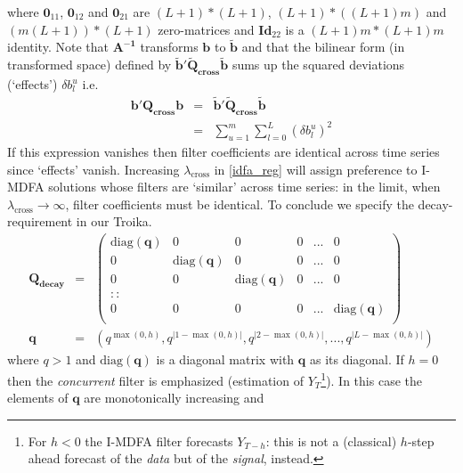 \documentclass[11pt]{article}
\begin{document}
where $\mathbf{0}_{11}$, $\mathbf{0}_{12}$ and $\mathbf{0}_{21}$ are $(L+1)*(L+1)$, $(L+1)*((L+1)m)$ and $(m(L+1))*(L+1)$ zero-matrices and $\mathbf{Id}_{22}$ is a $(L+1)m*(L+1)m$ identity. Note that $\mathbf{A^{-1}}$ transforms $\mathbf{b}$ to $\mathbf{\tilde{b}}$ and that the bilinear form (in transformed space)  defined by $\mathbf{\tilde{b}}'\mathbf{\tilde{Q}_{cross}}\mathbf{\tilde{b}}$  sums up the squared deviations (`effects') $\delta b_l^u$ i.e.
\begin{eqnarray*}
\mathbf{b'Q_{cross}b}&=&\mathbf{\tilde{b}}'\mathbf{\tilde{Q}_{cross}}\mathbf{\tilde{b}}\\
&=&\sum_{u=1}^m \sum_{l=0}^L(\delta b_l^u)^2
\end{eqnarray*}
If this expression vanishes then filter coefficients are identical across time series since  `effects' vanish. Increasing $\lambda_{\textrm{cross}}$ in \ref{idfa_reg} will assign preference to I-MDFA solutions whose filters are `similar' across time series: in the limit, when $\lambda_{\textrm{cross}}\to \infty$, filter coefficients must be identical. To conclude we specify the decay-requirement in our Troika.  
\begin{eqnarray}
\mathbf{Q_{decay}}&=&\left(\begin{array}{cccccc}
\textrm{diag}(\mathbf{q})&0                                                    &0                                                    &0&...&0\\
0                                               &\textrm{diag}(\mathbf{q})&0                                                   &0&...&0\\
0                                               &0                                                    &\textrm{diag}(\mathbf{q})&0&...&0\\
::\\
0                                              &0                                                    &0                                                     &0&...&\textrm{diag}(\mathbf{q})\\
\end{array}\right)\nonumber\\
\mathbf{q}&=&(q^{\max(0,h)},{q}^{|1-\max(0,h)|},{q}^{|2-\max(0,h)|},...,{q}^{|L-\max(0,h)|})\label{qvecdef}
\end{eqnarray}
where $q>1$ and $\textrm{diag}(\mathbf{q})$ is a diagonal matrix with $\mathbf{q}$ as its diagonal. If $h=0$ then the \emph{concurrent} filter is emphasized (estimation of $Y_T$\footnote{For $h<0$ the I-MDFA filter forecasts $Y_{T-h}$: this is not a (classical) $h$-step ahead forecast of the \emph{data} but of the \emph{signal}, instead.}). In this case the elements of $\mathbf{q}$ are monotonically increasing and 
\end{document}
